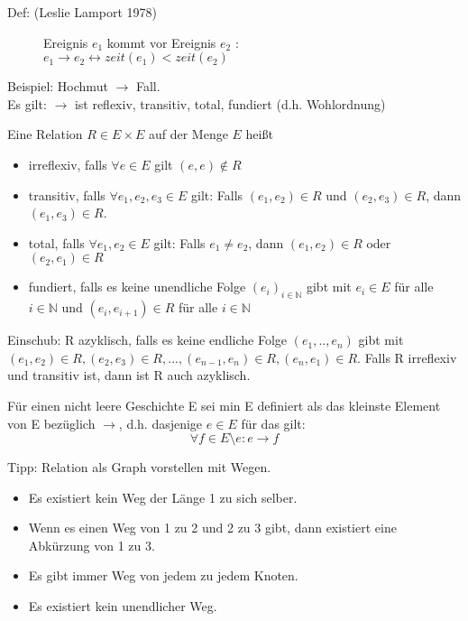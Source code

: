\begin{description}
\item[Def: (Leslie Lamport 1978)] Ereignis $e_1$ kommt vor Ereignis $e_2$ :\\
$e_1 \rightarrow e_2 \leftrightarrow  zeit(e_1) < zeit(e_2)$
\end{description}

Beispiel: Hochmut  $\rightarrow$ Fall.\\
Es gilt:  $\rightarrow$ ist reflexiv, transitiv, total, fundiert (d.h. Wohlordnung)

Eine Relation $R \in E \times E$ auf der Menge $E$ heißt
\begin{itemize}
	\item irreflexiv, falls $\forall e \in E $ gilt $ (e, e) \notin R$
	\item transitiv, falls $\forall e_1, e_2, e_3 \in E $ gilt: Falls $(e_1,e_2) \in R $ und $ (e_2,e_3) \in R$, dann $(e_1,e_3) \in R$.
	\item total, falls $\forall e_1,e_2 \in E$ gilt: Falls $e_1 \neq e_2$, dann $(e_1, e_2) \in R$ oder $(e_2, e_1) \in R$
	\item fundiert, falls es keine unendliche Folge $(e_i)_{i \in \mathbb{N}}$ gibt mit $e_i \in E$ für alle $i \in \mathbb{N}$ und $(e_i, e_{i+1}) \in R$ für alle $i \in \mathbb{N}$
\end{itemize}

Einschub: R azyklisch, falls es keine endliche Folge $(e_1,..,e_n)$ gibt mit $(e_1,e_2) \in R, (e_2,e_3) \in R,...,(e_{n-1},e_n) \in R, (e_n,e_1) \in R$.
Falls R irreflexiv und transitiv ist, dann ist R auch azyklisch.

Für einen nicht leere Geschichte E sei min E definiert als das kleinste Element von E bezüglich $\rightarrow$, d.h. dasjenige $e \in E$ für das gilt:
\begin{equation*}
\forall f \in E\setminus{e}: e \rightarrow f
\end{equation*}

Tipp: Relation als Graph vorstellen mit Wegen.
\begin{itemize}
	\item Es existiert kein Weg der Länge 1 zu sich selber.
	\item Wenn es einen Weg von 1 zu 2 und 2 zu 3 gibt, dann existiert eine Abkürzung von 1 zu 3.
	\item Es gibt immer Weg von jedem zu jedem Knoten.
	\item Es existiert kein unendlicher Weg.
\end{itemize}

